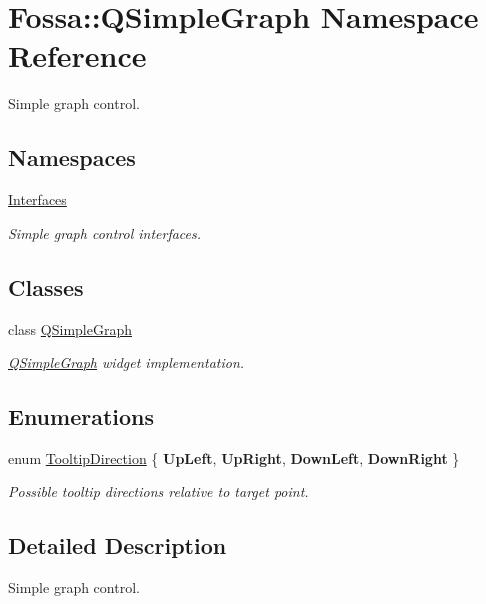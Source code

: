 \hypertarget{namespace_fossa_1_1_q_simple_graph}{}\section{Fossa\+:\+:Q\+Simple\+Graph Namespace Reference}
\label{namespace_fossa_1_1_q_simple_graph}


Simple graph control.  


\subsection*{Namespaces}
\begin{DoxyCompactItemize}
\item 
 \hyperlink{namespace_fossa_1_1_q_simple_graph_1_1_interfaces}{Interfaces}
\begin{DoxyCompactList}\small\item\em Simple graph control interfaces. \end{DoxyCompactList}\end{DoxyCompactItemize}
\subsection*{Classes}
\begin{DoxyCompactItemize}
\item 
class \hyperlink{class_fossa_1_1_q_simple_graph_1_1_q_simple_graph}{Q\+Simple\+Graph}
\begin{DoxyCompactList}\small\item\em \hyperlink{class_fossa_1_1_q_simple_graph_1_1_q_simple_graph}{Q\+Simple\+Graph} widget implementation. \end{DoxyCompactList}\end{DoxyCompactItemize}
\subsection*{Enumerations}
\begin{DoxyCompactItemize}
\item 
\mbox{\label{namespace_fossa_1_1_q_simple_graph_a0c50b3eb82acac4a64e9b291c8f1b7cc}} 
enum \hyperlink{namespace_fossa_1_1_q_simple_graph_a0c50b3eb82acac4a64e9b291c8f1b7cc}{Tooltip\+Direction} \{ {\bfseries Up\+Left}, 
{\bfseries Up\+Right}, 
{\bfseries Down\+Left}, 
{\bfseries Down\+Right}
 \}\begin{DoxyCompactList}\small\item\em Possible tooltip directions relative to target point. \end{DoxyCompactList}
\end{DoxyCompactItemize}


\subsection{Detailed Description}
Simple graph control. 